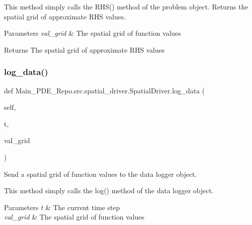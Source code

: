 This method simply calls the R\+H\+S() method of the problem object. Returns the spatial grid of approximate R\+HS values. 
\begin{DoxyParams}{Parameters}
{\em val\+\_\+grid} & The spatial grid of function values \\
\hline
\end{DoxyParams}
\begin{DoxyReturn}{Returns}
The spatial grid of approximate R\+HS values 
\end{DoxyReturn}
\mbox{\label{classMain__PDE__Repo_1_1src_1_1spatial__driver_1_1SpatialDriver_ace8ab1e2e0d8e9da601ecddf44d504c2}} 
\subsubsection{\texorpdfstring{log\+\_\+data()}{log\_data()}}
{\footnotesize\ttfamily def Main\+\_\+\+P\+D\+E\+\_\+\+Repo.\+src.\+spatial\+\_\+driver.\+Spatial\+Driver.\+log\+\_\+data (\begin{DoxyParamCaption}\item[{}]{self,  }\item[{}]{t,  }\item[{}]{val\+\_\+grid }\end{DoxyParamCaption})}



Send a spatial grid of function values to the data logger object. 

This method simply calls the log() method of the data logger object. 
\begin{DoxyParams}{Parameters}
{\em t} & The current time step \\
\hline
{\em val\+\_\+grid} & The spatial grid of function values \\
\hline
\end{DoxyParams}
\mbox{\label{classMain__PDE__Repo_1_1src_1_1spatial__driver_1_1SpatialDriver_a8383df7f86b0bca04a6787290438cde7}} 
